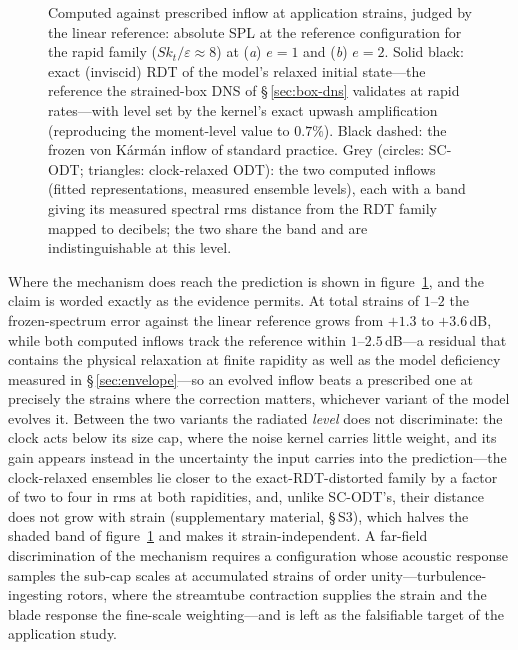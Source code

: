 \documentclass[11pt,a4paper]{article}
\begin{document}
\begin{figure}
  \centering
  \caption{Computed against prescribed inflow at application strains,
  judged by the linear reference: absolute SPL at the reference
  configuration for the rapid family ($Sk_t/\varepsilon\approx8$) at
  (\textit{a}) $e=1$ and (\textit{b}) $e=2$. Solid black: exact
  (inviscid) RDT of the model's relaxed initial state---the reference the
  strained-box DNS of \S\,\ref{sec:box-dns} validates at rapid
  rates---with level set by the kernel's exact upwash amplification
  (reproducing the moment-level value to $0.7\%$). Black dashed: the
  frozen von K\'arm\'an inflow of standard practice. Grey (circles:
  SC-ODT; triangles: clock-relaxed ODT): the two computed inflows
  (fitted representations, measured ensemble levels), each with a band
  giving its measured spectral rms distance from the RDT family mapped
  to decibels; the two share the band and are indistinguishable at this
  level.}
  \label{fig:amiet-rapid}
\end{figure}

Where the mechanism does reach the prediction is shown in
figure~\ref{fig:amiet-rapid}, and the claim is worded exactly as the
evidence permits. At total strains of $1$--$2$ the frozen-spectrum
error against the linear reference grows from $+1.3$ to $+3.6$\,dB,
while both computed inflows track the reference within
$1$--$2.5$\,dB---a residual that contains the physical relaxation at
finite rapidity as well as the model deficiency measured in
\S\,\ref{sec:envelope}---so an evolved inflow beats a prescribed one
at precisely the strains where the correction matters, whichever
variant of the model evolves it. Between the two variants the
radiated \emph{level} does not discriminate: the clock acts below its
size cap, where the noise kernel carries little weight, and its gain
appears instead in the uncertainty the input carries into the
prediction---the clock-relaxed ensembles lie closer to the
exact-RDT-distorted family by a factor of two to four in rms at both
rapidities, and, unlike SC-ODT's, their distance does not
grow with strain (supplementary material, \S\,S3), which halves the
shaded band of figure~\ref{fig:amiet-rapid} and makes it
strain-independent. A far-field discrimination of the mechanism
requires a configuration whose acoustic response samples the sub-cap
scales at accumulated strains of order unity---turbulence-ingesting
rotors, where the streamtube contraction supplies the strain and the
blade response the fine-scale weighting---and is left as the
falsifiable target of the application study.
\end{document}
